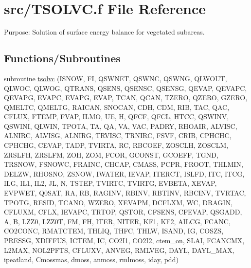 \hypertarget{TSOLVC_8f}{}\section{src/\+T\+S\+O\+L\+V\+C.f File Reference}
\label{TSOLVC_8f}


Purpose\+: Solution of surface energy balance for vegetated subareas.  


\subsection*{Functions/\+Subroutines}
\begin{DoxyCompactItemize}
\item 
subroutine \hyperlink{TSOLVC_8f_a824dab26436ace6ad8f0f9e2f6908ce2}{tsolvc} (I\+S\+N\+O\+W, F\+I, Q\+S\+W\+N\+E\+T, Q\+S\+W\+N\+C, Q\+S\+W\+N\+G, Q\+L\+W\+O\+U\+T, Q\+L\+W\+O\+C, Q\+L\+W\+O\+G, Q\+T\+R\+A\+N\+S, Q\+S\+E\+N\+S, Q\+S\+E\+N\+S\+C, Q\+S\+E\+N\+S\+G, Q\+E\+V\+A\+P, Q\+E\+V\+A\+P\+C, Q\+E\+V\+A\+P\+G, E\+V\+A\+P\+C, E\+V\+A\+P\+G, E\+V\+A\+P, T\+C\+A\+N, Q\+C\+A\+N, T\+Z\+E\+R\+O, Q\+Z\+E\+R\+O, G\+Z\+E\+R\+O, Q\+M\+E\+L\+T\+C, Q\+M\+E\+L\+T\+G, R\+A\+I\+C\+A\+N, S\+N\+O\+C\+A\+N, C\+D\+H, C\+D\+M, R\+I\+B, T\+A\+C, Q\+A\+C, C\+F\+L\+U\+X, F\+T\+E\+M\+P, F\+V\+A\+P, I\+L\+M\+O, U\+E, H, Q\+F\+C\+F, Q\+F\+C\+L, H\+T\+C\+C, Q\+S\+W\+I\+N\+V, Q\+S\+W\+I\+N\+I, Q\+L\+W\+I\+N, T\+P\+O\+T\+A, T\+A, Q\+A, V\+A, V\+A\+C, P\+A\+D\+R\+Y, R\+H\+O\+A\+I\+R, A\+L\+V\+I\+S\+C, A\+L\+N\+I\+R\+C, A\+L\+V\+I\+S\+G, A\+L\+N\+I\+R\+G, T\+R\+V\+I\+S\+C, T\+R\+N\+I\+R\+C, F\+S\+V\+F, C\+R\+I\+B, C\+P\+H\+C\+H\+C, C\+P\+H\+C\+H\+G, C\+E\+V\+A\+P, T\+A\+D\+P, T\+V\+I\+R\+T\+A, R\+C, R\+B\+C\+O\+E\+F, Z\+O\+S\+C\+L\+H, Z\+O\+S\+C\+L\+M, Z\+R\+S\+L\+F\+H, Z\+R\+S\+L\+F\+M, Z\+O\+H, Z\+O\+M, F\+C\+O\+R, G\+C\+O\+N\+S\+T, G\+C\+O\+E\+F\+F, T\+G\+N\+D, T\+R\+S\+N\+O\+W, F\+S\+N\+O\+W\+C, F\+R\+A\+I\+N\+C, C\+H\+C\+A\+P, C\+M\+A\+S\+S, P\+C\+P\+R, F\+R\+O\+O\+T, T\+H\+L\+M\+I\+N, D\+E\+L\+Z\+W, R\+H\+O\+S\+N\+O, Z\+S\+N\+O\+W, I\+W\+A\+T\+E\+R, I\+E\+V\+A\+P, I\+T\+E\+R\+C\+T, I\+S\+L\+F\+D, I\+T\+C, I\+T\+C\+G, I\+L\+G, I\+L1, I\+L2, J\+L, N, T\+S\+T\+E\+P, T\+V\+I\+R\+T\+C, T\+V\+I\+R\+T\+G, E\+V\+B\+E\+T\+A, X\+E\+V\+A\+P, E\+V\+P\+W\+E\+T, Q0\+S\+A\+T, R\+A, R\+B, R\+A\+G\+I\+N\+V, R\+B\+I\+N\+V, R\+B\+T\+I\+N\+V, R\+B\+C\+I\+N\+V, T\+V\+R\+T\+A\+C, T\+P\+O\+T\+G, R\+E\+S\+I\+D, T\+C\+A\+N\+O, W\+Z\+E\+R\+O, X\+E\+V\+A\+P\+M, D\+C\+F\+L\+X\+M, W\+C, D\+R\+A\+G\+I\+N, C\+F\+L\+U\+X\+M, C\+F\+L\+X, I\+E\+V\+A\+P\+C, T\+R\+T\+O\+P, Q\+S\+T\+O\+R, C\+F\+S\+E\+N\+S, C\+F\+E\+V\+A\+P, Q\+S\+G\+A\+D\+D, A, B, L\+Z\+Z0, L\+Z\+Z0\+T, F\+M, F\+H, I\+T\+E\+R, N\+I\+T\+E\+R, K\+F1, K\+F2, A\+I\+L\+C\+G, F\+C\+A\+N\+C, C\+O2\+C\+O\+N\+C, R\+M\+A\+T\+C\+T\+E\+M, T\+H\+L\+I\+Q, T\+H\+F\+C, T\+H\+L\+W, I\+S\+A\+N\+D, I\+G, C\+O\+S\+Z\+S, P\+R\+E\+S\+S\+G, X\+D\+I\+F\+F\+U\+S, I\+C\+T\+E\+M, I\+C, C\+O2\+I1, C\+O2\+I2, ctem\+\_\+on, S\+L\+A\+I, F\+C\+A\+N\+C\+M\+X, L2\+M\+A\+X, N\+O\+L2\+P\+F\+T\+S, C\+F\+L\+U\+X\+V, A\+N\+V\+E\+G, R\+M\+L\+V\+E\+G, D\+A\+Y\+L, D\+A\+Y\+L\+\_\+\+M\+A\+X, ipeatland, Cmossmas, dmoss, anmoss, rmlmoss, iday, pdd)
\end{DoxyCompactItemize}


